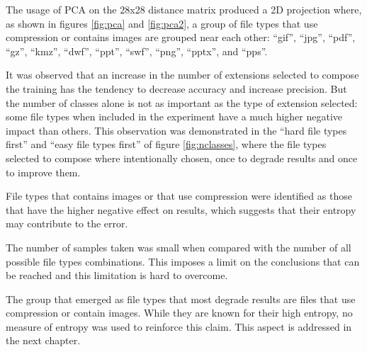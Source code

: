 
The usage of PCA on the 28x28 distance matrix produced a 2D projection where, as shown in figures \ref{fig:pca} and \ref{fig:pca2}, a group of file types that use compression or contains images are grouped near each other: 
``gif'',
``jpg'',
``pdf'',
``gz'',
``kmz'',
``dwf'',
``ppt'',
``swf'',
``png'',
``pptx'',
and ``pps''.

It was observed that an increase in the number of extensions selected to compose the training has the tendency to decrease accuracy and increase precision. But the number of classes alone is not as important as the type of extension selected: some file types when included in the experiment have a much higher negative impact than others. This observation was demonstrated in the ``hard file types first'' and ``easy file types first'' of figure \ref{fig:nclasses}, where the file types selected to compose  where intentionally chosen, once to degrade results and once to improve them.

File types that contains images or that use compression were identified as those that have the higher negative effect on results, which suggests that their entropy may contribute to the error.


The number of samples taken was small when compared with the number of all possible file types combinations. This imposes a limit on the conclusions that can be reached and this limitation is hard to overcome.

The group that emerged as file types that most degrade results are files that use compression or contain images. While they are known for their high entropy, no measure of entropy was used to reinforce this claim.
This aspect is addressed in the next chapter.
